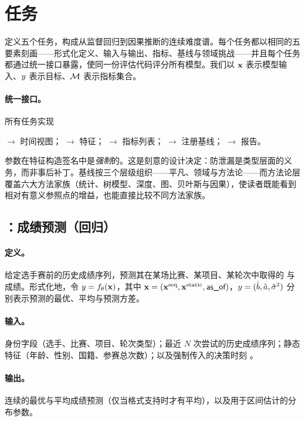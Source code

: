 \section{任务}
\label{sec:tasks}

\wcabench{} 定义五个任务，构成从监督回归到因果推断的连续难度谱。每个任务都以相同的五要素刻画——形式化定义、输入与输出、指标、基线与领域挑战——并且每个任务都通过统一接口暴露，使同一份评估代码评分所有模型。我们以 $\mathbf{x}$ 表示模型输入、$y$ 表示目标、$\mathcal{M}$ 表示指标集合。

\paragraph{统一接口。}所有任务实现
\begin{center}\small
{} $\to$ 时间视图；\quad
{} $\to$ 特征；\quad
{} $\to$ 指标列表；\quad
{} $\to$ 注册基线；\quad
{} $\to$ 报告。
\end{center}
\asof{} 参数在特征构造签名中是\emph{强制}的。这是刻意的设计决定：防泄漏是类型层面的义务，而非事后补丁。基线按三个层级组织——平凡、领域与方法论——而方法论层覆盖六大方法家族（统计、树模型、深度、图、贝叶斯与因果），使读者既能看到相对有意义参照点的增益，也能直接比较不同方法家族。

\subsection{：成绩预测（回归）}
\label{sec:task1}

\paragraph{定义。}给定选手赛前的历史成绩序列，预测其在某场比赛、某项目、某轮次中取得的  与  成绩。形式化地，令 $y = f_\theta(\mathbf{x})$，其中 $\mathbf{x} = (\mathbf{x}^{\text{seq}}, \mathbf{x}^{\text{static}}, \textsf{as\_of})$，$y = (\hat{b}, \hat{a}, \hat{\sigma}^2)$ 分别表示预测的最优、平均与预测方差。

\paragraph{输入。}身份字段（选手、比赛、项目、轮次类型）；最近 $N$ 次尝试的历史成绩序列；静态特征（年龄、性别、国籍、参赛总次数）；以及强制传入的决策时刻 \asof{}。

\paragraph{输出。}连续的最优与平均成绩预测（仅当格式支持时才有平均），以及用于区间估计的分布参数。

